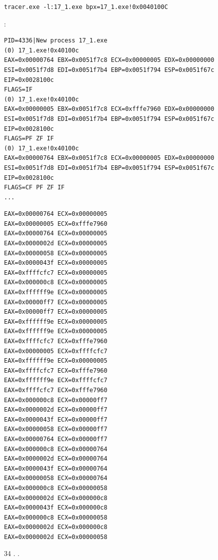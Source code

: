 \begin{lstlisting}
tracer.exe -l:17_1.exe bpx=17_1.exe!0x0040100C
\end{lstlisting}

%
:

\begin{lstlisting}
PID=4336|New process 17_1.exe
(0) 17_1.exe!0x40100c
EAX=0x00000764 EBX=0x0051f7c8 ECX=0x00000005 EDX=0x00000000
ESI=0x0051f7d8 EDI=0x0051f7b4 EBP=0x0051f794 ESP=0x0051f67c
EIP=0x0028100c
FLAGS=IF
(0) 17_1.exe!0x40100c
EAX=0x00000005 EBX=0x0051f7c8 ECX=0xfffe7960 EDX=0x00000000
ESI=0x0051f7d8 EDI=0x0051f7b4 EBP=0x0051f794 ESP=0x0051f67c
EIP=0x0028100c
FLAGS=PF ZF IF
(0) 17_1.exe!0x40100c
EAX=0x00000764 EBX=0x0051f7c8 ECX=0x00000005 EDX=0x00000000
ESI=0x0051f7d8 EDI=0x0051f7b4 EBP=0x0051f794 ESP=0x0051f67c
EIP=0x0028100c
FLAGS=CF PF ZF IF
...
\end{lstlisting}

%

\begin{lstlisting}
EAX=0x00000764 ECX=0x00000005
EAX=0x00000005 ECX=0xfffe7960
EAX=0x00000764 ECX=0x00000005
EAX=0x0000002d ECX=0x00000005
EAX=0x00000058 ECX=0x00000005
EAX=0x0000043f ECX=0x00000005
EAX=0xffffcfc7 ECX=0x00000005
EAX=0x000000c8 ECX=0x00000005
EAX=0xffffff9e ECX=0x00000005
EAX=0x00000ff7 ECX=0x00000005
EAX=0x00000ff7 ECX=0x00000005
EAX=0xffffff9e ECX=0x00000005
EAX=0xffffff9e ECX=0x00000005
EAX=0xffffcfc7 ECX=0xfffe7960
EAX=0x00000005 ECX=0xffffcfc7
EAX=0xffffff9e ECX=0x00000005
EAX=0xffffcfc7 ECX=0xfffe7960
EAX=0xffffff9e ECX=0xffffcfc7
EAX=0xffffcfc7 ECX=0xfffe7960
EAX=0x000000c8 ECX=0x00000ff7
EAX=0x0000002d ECX=0x00000ff7
EAX=0x0000043f ECX=0x00000ff7
EAX=0x00000058 ECX=0x00000ff7
EAX=0x00000764 ECX=0x00000ff7
EAX=0x000000c8 ECX=0x00000764
EAX=0x0000002d ECX=0x00000764
EAX=0x0000043f ECX=0x00000764
EAX=0x00000058 ECX=0x00000764
EAX=0x000000c8 ECX=0x00000058
EAX=0x0000002d ECX=0x000000c8
EAX=0x0000043f ECX=0x000000c8
EAX=0x000000c8 ECX=0x00000058
EAX=0x0000002d ECX=0x000000c8
EAX=0x0000002d ECX=0x00000058
\end{lstlisting}

 34 .
.

